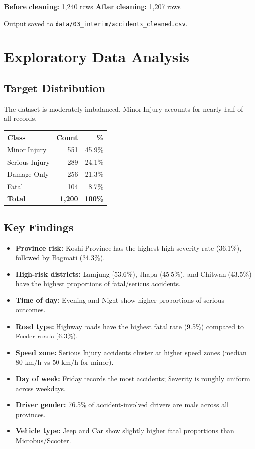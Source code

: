 \documentclass[12pt,a4paper]{article}
\begin{document}
\textbf{Before cleaning:} 1,240 rows \quad\textbf{After cleaning:} 1,207 rows

Output saved to \texttt{data/03\_interim/accidents\_cleaned.csv}.

\section{Exploratory Data Analysis}

\subsection{Target Distribution}
The dataset is moderately imbalanced. Minor Injury accounts for nearly half of all records.

\begin{center}
\begin{tabular}{lrr}
\toprule
\textbf{Class} & \textbf{Count} & \textbf{\%} \\
\midrule
Minor Injury   & 551 & 45.9\% \\
Serious Injury & 289 & 24.1\% \\
Damage Only    & 256 & 21.3\% \\
Fatal          & 104 &  8.7\% \\
\midrule
\textbf{Total} & \textbf{1,200} & \textbf{100\%} \\
\bottomrule
\end{tabular}
\end{center}

\subsection{Key Findings}

\begin{itemize}[leftmargin=1.5cm]
    \item \textbf{Province risk:} Koshi Province has the highest high-severity rate (36.1\%), followed by Bagmati (34.3\%).
    \item \textbf{High-risk districts:} Lamjung (53.6\%), Jhapa (45.5\%), and Chitwan (43.5\%) have the highest proportions of fatal/serious accidents.
    \item \textbf{Time of day:} Evening and Night show higher proportions of serious outcomes.
    \item \textbf{Road type:} Highway roads have the highest fatal rate (9.5\%) compared to Feeder roads (6.3\%).
    \item \textbf{Speed zone:} Serious Injury accidents cluster at higher speed zones (median 80 km/h vs 50 km/h for minor).
    \item \textbf{Day of week:} Friday records the most accidents; Severity is roughly uniform across weekdays.
    \item \textbf{Driver gender:} 76.5\% of accident-involved drivers are male across all provinces.
    \item \textbf{Vehicle type:} Jeep and Car show slightly higher fatal proportions than Microbus/Scooter.
\end{itemize}
\end{document}
